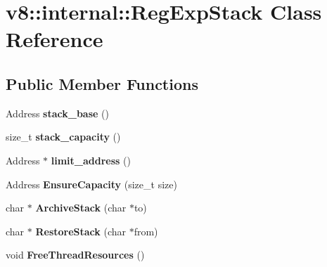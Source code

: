 \hypertarget{classv8_1_1internal_1_1_reg_exp_stack}{}\section{v8\+:\+:internal\+:\+:Reg\+Exp\+Stack Class Reference}
\label{classv8_1_1internal_1_1_reg_exp_stack}
\subsection*{Public Member Functions}
\begin{DoxyCompactItemize}
\item 
\hypertarget{classv8_1_1internal_1_1_reg_exp_stack_a59b6a5f5458cf12bf5d94455e65a1c69}{}Address {\bfseries stack\+\_\+base} ()\label{classv8_1_1internal_1_1_reg_exp_stack_a59b6a5f5458cf12bf5d94455e65a1c69}

\item 
\hypertarget{classv8_1_1internal_1_1_reg_exp_stack_a9ea506c5a110c559c7ecd5dd3f0bedd0}{}size\+\_\+t {\bfseries stack\+\_\+capacity} ()\label{classv8_1_1internal_1_1_reg_exp_stack_a9ea506c5a110c559c7ecd5dd3f0bedd0}

\item 
\hypertarget{classv8_1_1internal_1_1_reg_exp_stack_ae826479d94857331ae3c5358f9c54054}{}Address $\ast$ {\bfseries limit\+\_\+address} ()\label{classv8_1_1internal_1_1_reg_exp_stack_ae826479d94857331ae3c5358f9c54054}

\item 
\hypertarget{classv8_1_1internal_1_1_reg_exp_stack_a8ad338369295924ce1a6cc4777da4b7f}{}Address {\bfseries Ensure\+Capacity} (size\+\_\+t size)\label{classv8_1_1internal_1_1_reg_exp_stack_a8ad338369295924ce1a6cc4777da4b7f}

\item 
\hypertarget{classv8_1_1internal_1_1_reg_exp_stack_a360cf9b3de09e77f5f5b49beadd21c09}{}char $\ast$ {\bfseries Archive\+Stack} (char $\ast$to)\label{classv8_1_1internal_1_1_reg_exp_stack_a360cf9b3de09e77f5f5b49beadd21c09}

\item 
\hypertarget{classv8_1_1internal_1_1_reg_exp_stack_a9fcb45f19c31a1675f3d31640e584ea8}{}char $\ast$ {\bfseries Restore\+Stack} (char $\ast$from)\label{classv8_1_1internal_1_1_reg_exp_stack_a9fcb45f19c31a1675f3d31640e584ea8}

\item 
\hypertarget{classv8_1_1internal_1_1_reg_exp_stack_a66f53e7acd3d11da2928267ccaeea024}{}void {\bfseries Free\+Thread\+Resources} ()\label{classv8_1_1internal_1_1_reg_exp_stack_a66f53e7acd3d11da2928267ccaeea024}

\end{DoxyCompactItemize}
